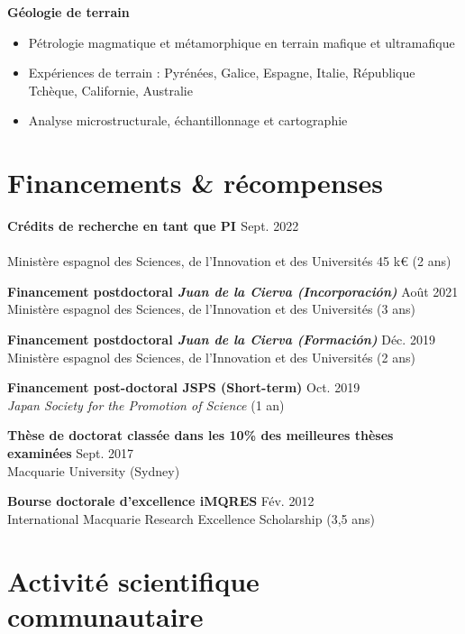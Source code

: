 \documentclass[a4paper,11pt]{article}
\begin{document}
    \textbf{Géologie de terrain}
    \begin{itemize}[itemsep=0pt,parsep=2pt]
        \item Pétrologie magmatique et métamorphique en terrain mafique et ultramafique
        \item Expériences de terrain : Pyrénées, Galice, Espagne, Italie, République Tchèque, Californie, Australie
        \item Analyse microstructurale, échantillonnage et cartographie
    \end{itemize}

\section{Financements \& récompenses}

    \textbf{Crédits de recherche en tant que PI \textit{}}
    \hfill {Sept. 2022}\\
    \\
    Ministère espagnol des Sciences, de l'Innovation et des Universités 45 k€ (2 ans)
    
    \textbf{Financement postdoctoral \textit{Juan de la Cierva (Incorporación)}}
    \hfill {Août 2021}\\
    Ministère espagnol des Sciences, de l'Innovation et des Universités (3 ans)
    
    \textbf{Financement postdoctoral \textit{Juan de la Cierva (Formación)}}
    \hfill {Déc. 2019}\\
    Ministère espagnol des Sciences, de l'Innovation et des Universités (2 ans)
    
    \textbf{Financement post-doctoral JSPS (Short-term)}
    \hfill {Oct. 2019}\\
    \textit{Japan Society for the Promotion of Science} (1 an)
    
    \textbf{Thèse de doctorat classée dans les 10\% des meilleures thèses examinées}
    \hfill {Sept. 2017}\\
    Macquarie University (Sydney)
    
    \textbf{Bourse doctorale d’excellence iMQRES}
    \hfill {Fév. 2012}\\
    International Macquarie Research Excellence Scholarship (3,5 ans)

\section{Activité scientifique communautaire}
\end{document}
